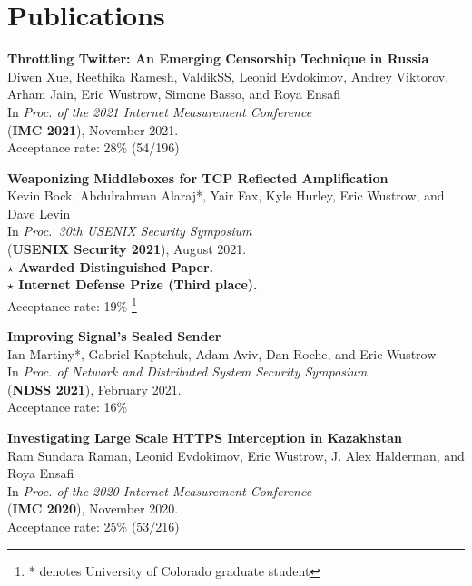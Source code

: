 \documentclass[margin,11pt]{res} %
\newcommand\blfootnote[1]{%
    \begingroup
    \renewcommand\thefootnote{}\footnote{#1}%
    \addtocounter{footnote}{-1}%
    \endgroup
}
\begin{document}

\vspace{6pt}
\section{\large Publications}
    \textbf{Throttling Twitter: An Emerging Censorship Technique in Russia} \\
    Diwen Xue, Reethika Ramesh, ValdikSS, Leonid Evdokimov, Andrey Viktorov, Arham Jain, Eric Wustrow, Simone Basso, and Roya Ensafi \\
    In \emph{Proc. of the 2021 Internet Measurement Conference} \\
    (\textbf{IMC 2021}), November 2021. \\
    Acceptance rate: 28\% (54/196)

    \textbf{Weaponizing Middleboxes for TCP Reflected Amplification} \\
    Kevin Bock, Abdulrahman Alaraj*, Yair Fax, Kyle Hurley, Eric Wustrow, and Dave Levin \\
    In \emph{Proc.\ 30th USENIX Security Symposium} \\
    (\textbf{USENIX Security 2021}), August 2021. \\
    \textbf{$\star$ Awarded Distinguished Paper.} \\
    \textbf{$\star$ Internet Defense Prize (Third place).} \\
    Acceptance rate: 19\% %
    \blfootnote{* denotes University of Colorado graduate student}

    \textbf{Improving Signal's Sealed Sender} \\
    Ian Martiny*, Gabriel Kaptchuk, Adam Aviv, Dan Roche, and Eric Wustrow \\
    In \emph{Proc. of Network and Distributed System Security Symposium} \\
    (\textbf{NDSS 2021}), February 2021. \\
    Acceptance rate: 16\% %

    \textbf{Investigating Large Scale HTTPS Interception in Kazakhstan} \\
    Ram Sundara Raman, Leonid Evdokimov, Eric Wustrow, J. Alex Halderman, and Roya Ensafi \\
    In \emph{Proc. of the 2020 Internet Measurement Conference} \\
    (\textbf{IMC 2020}), November 2020. \\
    Acceptance rate: 25\% (53/216)
\end{document}

